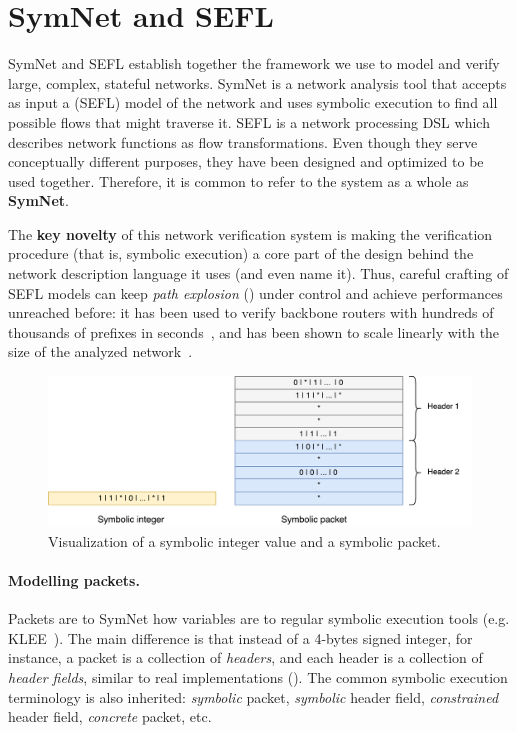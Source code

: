 \section{SymNet and SEFL}\label{sec:symnet-sefl}

SymNet and SEFL establish together the framework we use to model and verify
large, complex, stateful networks. SymNet is a network analysis tool that
accepts as input a (SEFL) model of the network and uses symbolic execution to
find all possible flows that might traverse it.  SEFL is a network processing
DSL which describes network functions as flow transformations.  Even though
they serve conceptually different purposes, they have been designed and
optimized to be used together.  Therefore, it is common to refer to the system
as a whole as \textbf{SymNet}.

The \textbf{key novelty} of this network verification system is making the
verification procedure (that is, symbolic execution) a core part of the design
behind the network description language it uses (and even name it).  Thus,
careful crafting of SEFL models can keep \emph{path explosion}
() under control and achieve
performances unreached before: it has been used to verify backbone routers with
hundreds of thousands of prefixes in seconds~\cite{stoenescu2016symnet}, and
has been shown to scale linearly with the size of the analyzed
network~\cite{stoenescu2013symnet}.

\begin{figure}[h]
  \centering
  \captionsetup{justification=centering}
  \includegraphics[scale=0.6]{src/img/symbolic-packet}
  \caption{Visualization of a symbolic integer value and a symbolic packet.}
  \label{fig:symbolic-packet}
\end{figure}

\paragraph{Modelling packets.}
Packets are to SymNet how variables are to regular symbolic execution tools
(e.g. KLEE~\cite{cadar2008klee}). The main difference is that instead of a
4-bytes signed integer, for instance, a packet is a collection of
\emph{headers}, and each header is a collection of \emph{header fields},
similar to real implementations ().
The common symbolic execution terminology is also inherited: \emph{symbolic}
packet, \emph{symbolic} header field, \emph{constrained} header field,
\emph{concrete} packet, etc.

